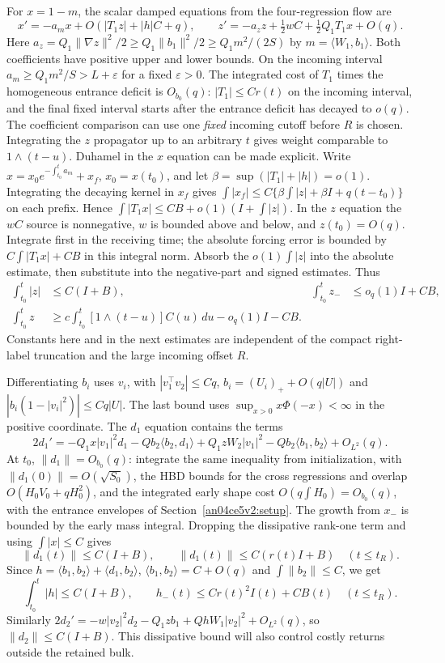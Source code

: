 \documentclass[11pt]{article}
\newcommand{\eps}{\varepsilon}
\newcommand{\norm}[1]{\lVert #1\rVert}
\begin{document}
For $x=1-m$, the scalar damped equations from the four-regression flow are
\[
 x'=-a_m x+O(|T_1 z|+|h|C+q),\qquad
 z'=-a_z z+\tfrac12 w C+\tfrac12 Q_1T_1 x+O(q).
\]
Here $a_z=Q_1\|\nabla z\|^2/2\ge Q_1\|b_1\|^2/2\ge Q_1m^2/(2S)$ by $m=\langle W_1,b_1\rangle$. Both coefficients have positive upper and lower bounds. On the incoming
interval $a_m\ge Q_1m^2/S>L+\eps$ for a fixed $\eps>0$.
The integrated cost of $T_1$ times the homogeneous entrance deficit
is $O_{b_0}(q)$: $|T_1|\le Cr(t)$ on the incoming interval, and the final
fixed interval starts after the entrance deficit has decayed to $o(q)$.
The coefficient comparison can use one \emph{fixed} incoming cutoff
before $R$ is chosen. Integrating the $z$ propagator up to an arbitrary
$t$ gives weight comparable to $1\wedge(t-u)$. Duhamel in the $x$
equation can be made explicit. Write $x=x_0 e^{-\int_{t_0}^t a_m}+x_f$, $x_0=x(t_0)$, and let $\beta=\sup(|T_1|+|h|)=o(1)$. Integrating the decaying kernel in $x_f$ gives
$\int|x_f|\le C\{\beta\int |z|+\beta I+q(t-t_0)\}$ on each prefix. Hence $\int|T_1 x|\le CB+o(1)(I+\int|z|)$. In the $z$ equation the $wC$ source is nonnegative, $w$ is bounded above and below, and $z(t_0)=O(q)$. Integrate first in the receiving time; the absolute forcing error is bounded by $C\int|T_1x|+CB$ in this integral norm. Absorb the $o(1)\int |z|$ into the absolute estimate, then substitute into the negative-part and signed estimates. Thus
\begin{align}
 \int_{t_0}^t |z|&\le C(I+B),&
 \int_{t_0}^t z_-&\le o_q(1) I+CB, \nonumber\\
 \int_{t_0}^t z&\ge c\int_{t_0}^t[1\wedge(t-u)]C(u)\,du-o_q(1)I-CB.
 \label{an04ce5v2:prefix}
\end{align}
Constants here and in the next estimates are independent of the compact
right-label truncation and the large incoming offset $R$.

Differentiating $b_i$ uses $v_i$, with $|v_1^\top v_2|\le Cq$,
$b_i=(U_i)_++O(q|U|)$ and
$|b_i(1-|v_i|^2)|\le Cq|U|$. The last bound uses
$\sup_{x>0}x\Phi(-x)<\infty$ in the positive coordinate.
The $d_1$ equation contains the terms
\[
 2d_1'=-Q_1x|v_1|^2d_1-Qb_2\langle b_2,d_1\rangle+
 Q_1 z W_2 |v_1|^2-Qb_2\langle b_1,b_2\rangle+O_{L^2}(q).
\]
At $t_0$, $\norm{d_1}=O_{b_0}(q)$: integrate the same inequality from
initialization, with $\norm{d_1(0)}=O(\sqrt{S_0})$, the HBD bounds for
the cross regressions and overlap $O(H_0V_0+qH_0^2)$, and the integrated
early shape cost $O(q\int H_0)=O_{b_0}(q)$, with the entrance envelopes of Section~\ref{an04ce5v2:setup}. The growth from $x_-$ is bounded by the early mass integral.
Dropping the dissipative rank-one term and using $\int |x|\le C$ gives
\[
 \norm{d_1(t)}\le C(I+B),\qquad
 \norm{d_1(t)}\le C(r(t)I+B)\quad(t\le t_R).
\]
Since $h=\langle b_1,b_2\rangle+\langle d_1,b_2\rangle$,
$\langle b_1,b_2\rangle=C+O(q)$ and $\int\norm{b_2}\le C$, we get
\begin{equation}
 \int_{t_0}^t|h|\le C(I+B),\qquad
 h_-(t)\le C r(t)^2 I(t)+C B(t)\quad(t\le t_R).
 \label{an04ce5v2:earlyh}
\end{equation}
Similarly $2d_2'=-w|v_2|^2d_2-Q_1zb_1+QhW_1|v_2|^2+O_{L^2}(q)$, so
$\norm{d_2}\le C(I+B)$. This dissipative bound will also control costly
returns outside the retained bulk.
\end{document}
